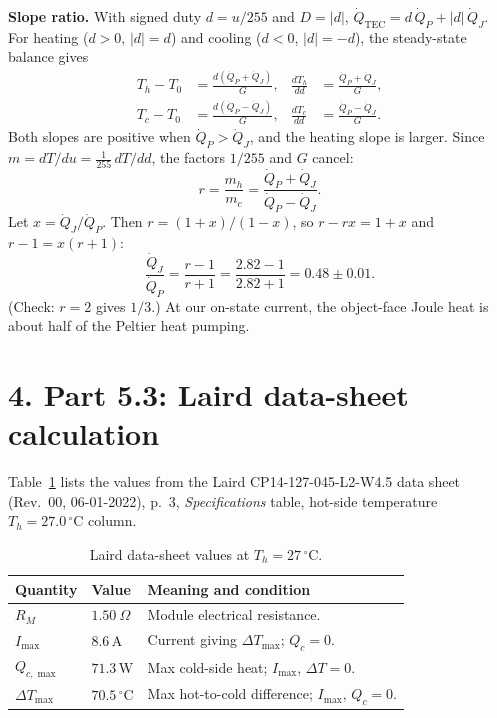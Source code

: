 \documentclass[reprint, amsmath, amssymb, aps]{revtex4-2}
\newcommand{\Qdot}{\dot Q}
\newcommand{\degC}{\,^\circ\mathrm{C}}
\begin{document}
\textbf{Slope ratio.} With signed duty $d = u/255$ and $D = |d|$,
$\Qdot_{\mathrm{TEC}} = d\,\Qdot_P + |d|\,\Qdot_J$. For heating ($d>0$, $|d| = d$) and
cooling ($d<0$, $|d| = -d$), the steady-state balance gives
\begin{align}
T_h - T_0 &= \frac{d(\Qdot_P + \Qdot_J)}{G}, & \frac{dT_h}{dd} &= \frac{\Qdot_P + \Qdot_J}{G},\\
T_c - T_0 &= \frac{d(\Qdot_P - \Qdot_J)}{G}, & \frac{dT_c}{dd} &= \frac{\Qdot_P - \Qdot_J}{G}.
\end{align}
Both slopes are positive when $\Qdot_P > \Qdot_J$, and the heating slope is larger. Since
$m = dT/du = \tfrac{1}{255}\,dT/dd$, the factors $1/255$ and $G$ cancel:
\begin{equation}
r = \frac{m_h}{m_c} = \frac{\Qdot_P + \Qdot_J}{\Qdot_P - \Qdot_J}.
\end{equation}
Let $x = \Qdot_J/\Qdot_P$. Then $r = (1+x)/(1-x)$, so $r - rx = 1 + x$ and $r - 1 = x(r+1)$:
\begin{equation}
\frac{\Qdot_J}{\Qdot_P} = \frac{r-1}{r+1} = \frac{2.82-1}{2.82+1} = 0.48 \pm 0.01 .
\end{equation}
(Check: $r = 2$ gives $1/3$.) At our on-state current, the object-face Joule heat is about
half of the Peltier heat pumping.

\section*{4. Part 5.3: Laird data-sheet calculation}

Table~\ref{tab:laird} lists the values from the Laird CP14-127-045-L2-W4.5 data sheet
(Rev.~00, 06-01-2022), p.~3, \emph{Specifications} table, hot-side temperature
$T_h = 27.0\degC$ column.

\begin{table}[h]
\caption{Laird data-sheet values at $T_h = 27\degC$.}
\label{tab:laird}
\begin{ruledtabular}
\begin{tabular}{lll}
Quantity & Value & Meaning and condition \\
\hline
$R_M$ & $1.50\ \Omega$ & Module electrical resistance. \\
$I_{\max}$ & $8.6$\,A & Current giving $\Delta T_{\max}$; $Q_c = 0$. \\
$Q_{c,\max}$ & $71.3$\,W & Max cold-side heat; $I_{\max}$, $\Delta T = 0$. \\
$\Delta T_{\max}$ & $70.5\degC$ & Max hot-to-cold difference; $I_{\max}$, $Q_c = 0$. \\
\end{tabular}
\end{ruledtabular}
\end{table}
\end{document}
